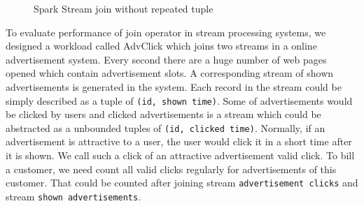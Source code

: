\begin{figure}
  \begin{center}
   \caption{Spark Stream join without repeated tuple}
   \label{fig:spark_join_norepeat}
  \end{center}
\end{figure}


To evaluate performance of join operator in stream processing systems, we designed a workload called AdvClick which joins two streams in a online advertisement system. Every second there are a huge number of web pages opened which contain advertisement slots. A corresponding stream of shown advertisements is generated in the system. Each record in the stream could be simply described as a tuple of \texttt{(id, shown time)}. Some of advertisements would be clicked by users and clicked advertisements is a stream which could be abstracted as a unbounded tuples of \texttt{(id, clicked time)}. Normally, if an advertisement is attractive to a user, the user would click it in a short time after it is shown. We call such a click of an attractive advertisement valid click. To bill a customer, we need count all valid clicks regularly for advertisements of this customer. That could be counted after joining stream \texttt{advertisement clicks} and stream \texttt{shown advertisements}. 

